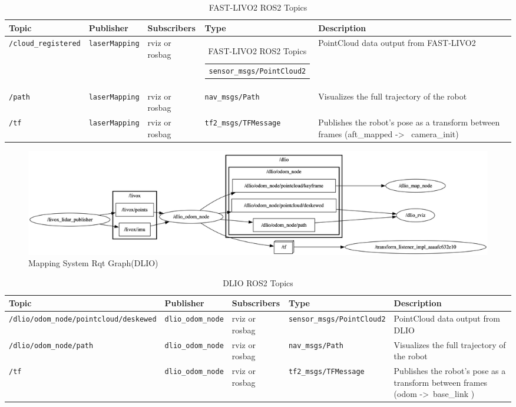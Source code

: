 \documentclass[english, bachelor, utf8]{base/thesis_telematics}
\begin{document}
\begin{table}[H]
\centering
\caption{FAST-LIVO2 ROS2 Topics}
\label{tab:fast_livo_topics}
\scriptsize  %
\begin{tabularx}{\textwidth}{@{}llXlX@{}}
\toprule
\textbf{Topic} & \textbf{Publisher} & \textbf{Subscribers} & \textbf{Type} & \textbf{Description} \\
\midrule
\texttt{/cloud\_registered} & \texttt{laserMapping} & rviz or rosbag & \begin{tabular}{@{}l@{}}\texttt{sensor\_msgs/PointCloud2}\end{tabular}  & PointCloud data output from FAST-LIVO2 \\[0.3em]
\texttt{/path} & \texttt{laserMapping} & rviz or rosbag & \texttt{nav\_msgs/Path} & Visualizes the full trajectory of the robot \\
\texttt{/tf} & \texttt{laserMapping} & rviz or rosbag & \texttt{tf2\_msgs/TFMessage} & Publishes the robot’s pose as a transform between frames (aft\_mapped -\textgreater~ camera\_init) \\

\bottomrule
\end{tabularx}
\end{table}



\clearpage

\begin{figure}[H]
    \centering
    \includegraphics[width=\textwidth]{pics/rqt/ros_dlio.png}
    \caption{Mapping System Rqt Graph(DLIO)}
    \label{fig:ros_dlio}
\end{figure}

\begin{table}[H]
\centering
\caption{DLIO ROS2 Topics}
\label{tab:dlio_topics}
\scriptsize  %
\begin{tabularx}{\textwidth}{@{}llXlX@{}}
\toprule
\textbf{Topic} & \textbf{Publisher} & \textbf{Subscribers} & \textbf{Type} & \textbf{Description} \\
\midrule
\texttt{/dlio/odom\_node/pointcloud/deskewed} & \texttt{dlio\_odom\_node} & rviz or rosbag & \texttt{sensor\_msgs/PointCloud2} & PointCloud data output from DLIO \\[0.3em]
\texttt{/dlio/odom\_node/path} & \texttt{dlio\_odom\_node} & rviz or rosbag & \texttt{nav\_msgs/Path} & Visualizes the full trajectory of the robot \\
\texttt{/tf} & \texttt{dlio\_odom\_node} & rviz or rosbag & \texttt{tf2\_msgs/TFMessage} & Publishes the robot’s pose as a transform between frames (odom -\textgreater~base\_link ) \\

\bottomrule
\end{tabularx}
\end{table}
\end{document}
